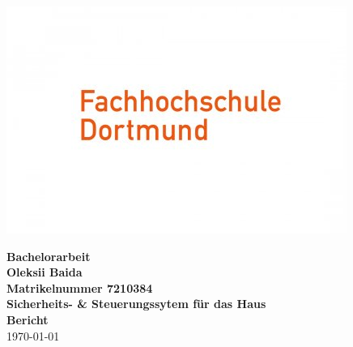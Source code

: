 \begin{titlepage}
  \includegraphics[width = 0.25\pdfpagewidth]{./Bilder/FHDO.jpg}
  \begin{center}
    
    \huge \textbf{\textsf{Bachelorarbeit}} \\
    \vspace{3cm}
    \large \textbf{Oleksii Baida}\\
    \textbf{Matrikelnummer 7210384}\\
    \vspace{3cm}
    \large \textbf{Sicherheits- \& Steuerungssytem für das Haus}\\
    \vspace{1cm}
    \large \textbf{Bericht}\\
    \vspace{1cm}
    \today
  \end{center}
\end{titlepage}